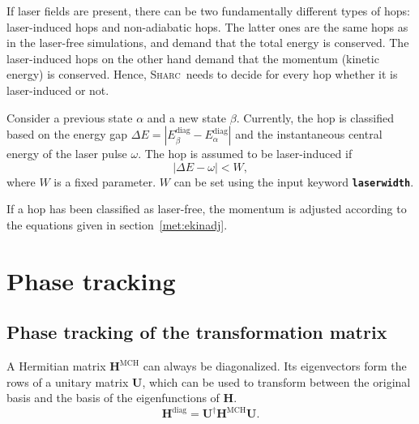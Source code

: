 \documentclass[a4paper,11pt,DIV=15,openany,twoside=false]{scrbook}
\newcommand{\sharc}{\textsc{Sharc}}
\newcommand{\ttt}[1]{\textbf{\texttt{#1}}}
\newcommand{\VEC}[1]{\ensuremath{\mathbf{#1}}}
\begin{document}
If laser fields are present, there can be two fundamentally different types of hops: laser-induced hops and non-adiabatic hops. The latter ones are the same hops as in the laser-free simulations, and demand that the total energy is conserved. The laser-induced hops on the other hand demand that the momentum (kinetic energy) is conserved. Hence, \sharc\ needs to decide for every hop whether it is laser-induced or not. 

Consider a previous state $\alpha$ and a new state $\beta$. Currently, the hop is classified based on the energy gap $\Delta E=|E_\beta^\text{diag}-E_\alpha^\text{diag}|$ and the instantaneous central energy of the laser pulse $\omega$. 
The hop is assumed to be laser-induced if
\begin{equation}
  |\Delta E-\omega| < W,
\end{equation}
where $W$ is a fixed parameter. $W$ can be set using the input keyword \ttt{laserwidth}.

If a hop has been classified as laser-free, the momentum is adjusted according to the equations given in section~\ref{met:ekinadj}.

\section{Phase tracking}

\subsection{Phase tracking of the transformation matrix}\label{met:phase_track}

A Hermitian matrix $\VEC{H}^{\text{MCH}}$ can always be diagonalized. Its eigenvectors form the rows of a unitary matrix $\VEC{U}$, which can be used to transform between the original basis and the basis of the eigenfunctions of $\VEC{H}$. 
\begin{equation}
  \VEC{H}^{\text{diag}}=\VEC{U}^\dagger\VEC{H}^{\text{MCH}}\VEC{U}.
\end{equation}
\end{document}
